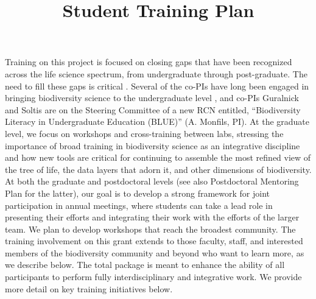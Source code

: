 \documentclass[11pt]{article}
\title{Student Training Plan \vspace{-1.5ex}}
\author{}
\date{}
\begin{document}
\maketitle
\thispagestyle{fancy} 
\vspace{-6em}


Training on this project is focused on closing gaps that have been
recognized across the life science spectrum, from undergraduate
through post-graduate.  The need to fill these gaps is critical
\citep{woodin2010}. Several of the co-PIs have long been engaged in
bringing biodiversity science to the undergraduate level
\citep[e.g.,][]{cook2014, lacey2017}, and co-PIs Guralnick and Soltis
are on the Steering Committee of a new RCN entitled, ``Biodiversity
Literacy in Undergraduate Education (BLUE)'' (A. Monfils, PI). At the
graduate level, we focus on workshops and cross-training between labs,
stressing the importance of broad training in biodiversity science as
an integrative discipline and how new tools are critical for
continuing to assemble the most refined view of the tree of life, the
data layers that adorn it, and other dimensions of biodiversity.  At
both the graduate and postdoctoral levels (see also Postdoctoral
Mentoring Plan for the latter), our goal is to develop a strong
framework for joint participation in annual meetings, where students
can take a lead role in presenting their efforts and integrating their
work with the efforts of the larger team.  We plan to develop
workshops that reach the broadest community.  The training involvement
on this grant extends to those faculty, staff, and interested members
of the biodiversity community and beyond who want to learn more, as we
describe below. The total package is meant to enhance the ability of
all participants to perform fully interdisciplinary and integrative
work.  We provide more detail on key training initiatives below.
\end{document}
